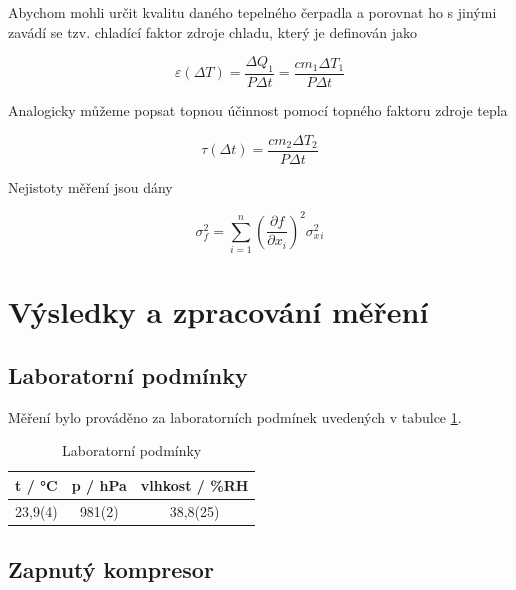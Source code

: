 Abychom mohli určit kvalitu daného tepelného čerpadla a porovnat ho s jinými zavádí se tzv. chladící faktor zdroje chladu, který je definován jako

\begin{equation}
    \varepsilon (\Delta T) = \frac{\Delta Q_1}{P \Delta t} = \frac{c m_1 \Delta T_1}{P \Delta t}
\end{equation}

Analogicky můžeme popsat topnou účinnost pomocí topného faktoru zdroje tepla

\begin{equation}
    \tau (\Delta t) = \frac{c m_2 \Delta T_2}{P \Delta t}
\end{equation}

Nejistoty měření jsou dány

\begin{equation}
    \sigma^2_f = \sum^n_{i=1} (\frac{\partial f}{\partial x_i})^2 \sigma^2_x_i
\end{equation}

\section{Výsledky a zpracování měření}

\subsection{Laboratorní podmínky}

    Měření bylo prováděno za laboratorních podmínek uvedených v tabulce \ref{tab:laboratorni-podminky}.

    \begin{table}[h]
        \centering
        \begin{tabular}{|c|c|c|} 
        \hline
            t / °C & p / hPa & vlhkost / \%RH  \\ 
        \hline
            23,9(4)   & 981(2)   & 38,8(25)            \\
        \hline
        \end{tabular}
        \caption{Laboratorní podmínky}
        \label{tab:laboratorni-podminky}
    \end{table}

\subsection{Zapnutý kompresor}

